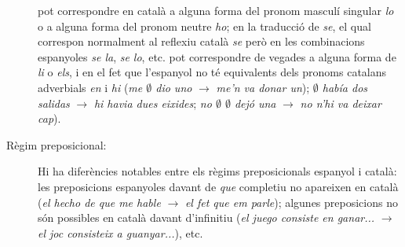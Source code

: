 \begin{description}
pot correspondre 
en català a alguna forma del pronom masculí singular {\em
  lo} o a alguna forma del
pronom neutre \emph{ho}; en la traducció de 
\emph{se}, el qual correspon normalment al reflexiu 
català \emph{se} però
en les combinacions espanyoles \emph{se la}, \emph{se lo}, etc. pot
correspondre de vegades a alguna forma de \emph{li} o \emph{els}, i en
el fet que l'espanyol no té equivalents dels pronoms catalans
adverbials \emph{en} i \emph{hi}  (\emph{me $\emptyset$ dio uno}
$\rightarrow$
\emph{me'n va donar un}); \emph{$\emptyset$ había dos salidas}
$\rightarrow$ \emph{hi havia dues eixides}; \emph{no $\emptyset$
  $\emptyset$ dejó una} $\rightarrow$ \emph{no n'hi va deixar cap}).
\item[Règim preposicional:] Hi ha diferències notables entre
  els règims preposicionals espanyol i català: les
  preposicions espanyoles davant de \emph{que} completiu no apareixen
  en català (\emph{el hecho de que me hable} $\rightarrow$ \emph{el
    fet que em parle}); algunes preposicions no són possibles en català
  davant d'infinitiu (\emph{el juego consiste en ganar...}
  $\rightarrow$ \emph{el joc consisteix a guanyar...}), etc.
\end{description}

